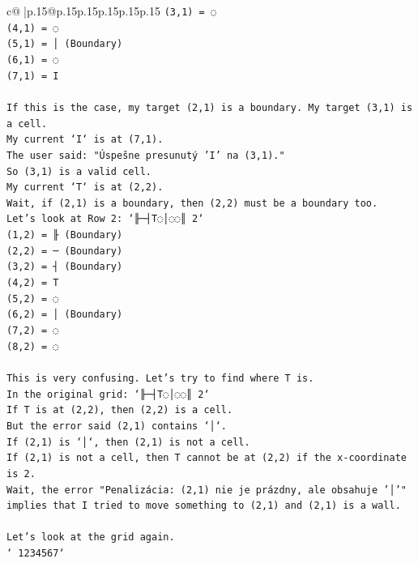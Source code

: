 \documentclass{article}
\begin{document}
{\begin{supertabular}{c@{$\;$}|p{.15\linewidth}@{}p{.15\linewidth}p{.15\linewidth}p{.15\linewidth}p{.15\linewidth}p{.15\linewidth}}
{{{\texttt{(3,1) = ◌} \\
\texttt{(4,1) = ◌} \\
\texttt{(5,1) = │ (Boundary)} \\
\texttt{(6,1) = ◌} \\
\texttt{(7,1) = I} \\
\\ 
\texttt{If this is the case, my target (2,1) is a boundary. My target (3,1) is a cell.} \\
\texttt{My current `I` is at (7,1).} \\
\texttt{The user said: "Úspešne presunutý 'I' na (3,1)."} \\
\texttt{So (3,1) is a valid cell.} \\
\texttt{My current `T` is at (2,2).} \\
\texttt{Wait, if (2,1) is a boundary, then (2,2) must be a boundary too.} \\
\texttt{Let's look at Row 2: `╟─┤T◌│◌◌║ 2`} \\
\texttt{(1,2) = ╟ (Boundary)} \\
\texttt{(2,2) = ─ (Boundary)} \\
\texttt{(3,2) = ┤ (Boundary)} \\
\texttt{(4,2) = T} \\
\texttt{(5,2) = ◌} \\
\texttt{(6,2) = │ (Boundary)} \\
\texttt{(7,2) = ◌} \\
\texttt{(8,2) = ◌} \\
\\ 
\texttt{This is very confusing. Let's try to find where T is.} \\
\texttt{In the original grid: `╟─┤T◌│◌◌║ 2`} \\
\texttt{If T is at (2,2), then (2,2) is a cell.} \\
\texttt{But the error said (2,1) contains `│`.} \\
\texttt{If (2,1) is `│`, then (2,1) is not a cell.} \\
\texttt{If (2,1) is not a cell, then T cannot be at (2,2) if the x{-}coordinate is 2.} \\
\texttt{Wait, the error "Penalizácia: (2,1) nie je prázdny, ale obsahuje '│'" implies that I tried to move something to (2,1) and (2,1) is a wall.} \\
\\ 
\texttt{Let's look at the grid again.} \\
\texttt{` 1234567`} \\
}}}
\end{supertabular}}
\end{document}
